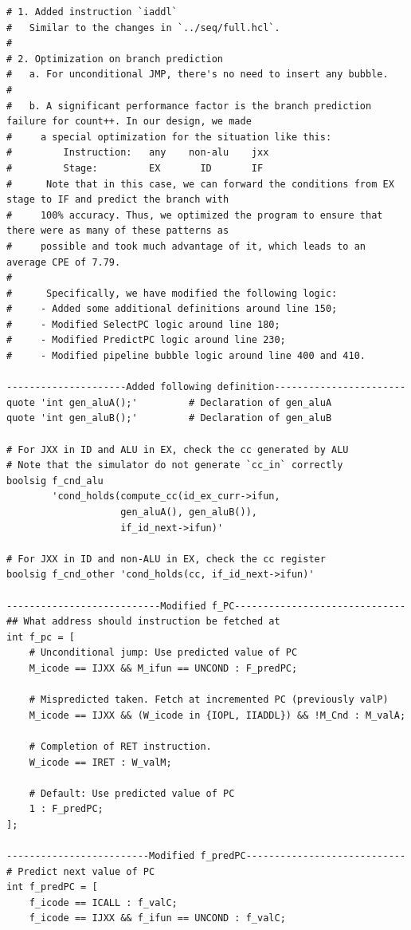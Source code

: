 \documentclass{article}
\begin{document}
\begin{lstlisting} 
# 1. Added instruction `iaddl`
#   Similar to the changes in `../seq/full.hcl`.
#
# 2. Optimization on branch prediction
#   a. For unconditional JMP, there's no need to insert any bubble.
#
#   b. A significant performance factor is the branch prediction failure for count++. In our design, we made
#     a special optimization for the situation like this:
#         Instruction:   any    non-alu    jxx
#         Stage:         EX       ID       IF
#      Note that in this case, we can forward the conditions from EX stage to IF and predict the branch with
#     100% accuracy. Thus, we optimized the program to ensure that there were as many of these patterns as
#     possible and took much advantage of it, which leads to an average CPE of 7.79.
#
#      Specifically, we have modified the following logic:
#     - Added some additional definitions around line 150;
#     - Modified SelectPC logic around line 180;
#     - Modified PredictPC logic around line 230;
#     - Modified pipeline bubble logic around line 400 and 410.

---------------------Added following definition-----------------------
quote 'int gen_aluA();'			# Declaration of gen_aluA
quote 'int gen_aluB();'			# Declaration of gen_aluB

# For JXX in ID and ALU in EX, check the cc generated by ALU
# Note that the simulator do not generate `cc_in` correctly
boolsig f_cnd_alu 
        'cond_holds(compute_cc(id_ex_curr->ifun, 
                    gen_aluA(), gen_aluB()), 
                    if_id_next->ifun)'

# For JXX in ID and non-ALU in EX, check the cc register
boolsig f_cnd_other 'cond_holds(cc, if_id_next->ifun)'

---------------------------Modified f_PC------------------------------
## What address should instruction be fetched at
int f_pc = [
	# Unconditional jump: Use predicted value of PC
	M_icode == IJXX && M_ifun == UNCOND : F_predPC;

	# Mispredicted taken. Fetch at incremented PC (previously valP)
	M_icode == IJXX && (W_icode in {IOPL, IIADDL}) && !M_Cnd : M_valA;

	# Completion of RET instruction.
	W_icode == IRET : W_valM;

	# Default: Use predicted value of PC
	1 : F_predPC;
];

-------------------------Modified f_predPC----------------------------
# Predict next value of PC
int f_predPC = [
	f_icode == ICALL : f_valC;
	f_icode == IJXX && f_ifun == UNCOND : f_valC;


\end{lstlisting}
\end{document}
